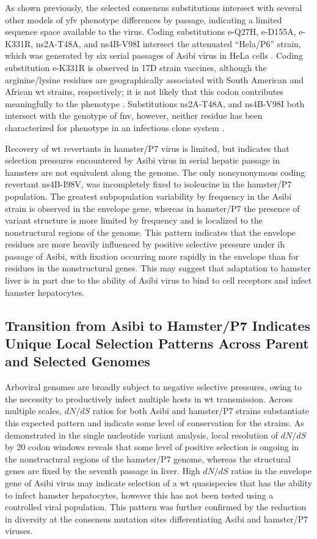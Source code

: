 As shown previously, the selected consensus substitutions intersect with several other models of \gls{yfv} phenotype differences by passage, indicating a limited sequence space available to the virus. Coding substitutions \gls{e}-Q27H, \gls{e}-D155A, \gls{e}-K331R, \gls{ns}2A-T48A, and \gls{ns}4B-V98I intersect the attenuated “Hela/P6” strain, which was generated by six serial passages of Asibi virus in HeLa cells \parencite{Dunster:1990jd}. Coding substitution \gls{e}-K331R is observed in 17D strain vaccines, although the arginine/lysine residues are geographically associated with South American and African \gls{wt} strains, respectively; it is not likely that this codon contributes meaningfully to the phenotype \parencite{Hahn:1987tw,dosSantos:1995wq}. Substitutions \gls{ns}2A-T48A, and \gls{ns}4B-V98I both intersect with the genotype of \gls{fnv}, however, neither residue has been characterized for phenotype in an infectious clone system \parencite{Wang:1995vu}.

Recovery of \gls{wt} revertants in hamster/P7 virus is limited, but indicates that selection pressures encountered by Asibi virus in serial hepatic passage in hamsters are not equivalent along the genome. The only nonsynonymous coding revertant \gls{ns}4B-I98V, was incompletely fixed to isoleucine in the hamster/P7 population. The greatest subpopulation variability by frequency in the Asibi strain is observed in the envelope gene, whereas in hamster/P7 the presence of variant structure is more limited by frequency and is localized to the nonstructural regions of the genome. This pattern indicates that the envelope residues are more heavily influenced by positive selective pressure under \gls{ih} passage of Asibi, with fixation occurring more rapidly in the envelope than for residues in the nonstructural genes. This may suggest that adaptation to hamster liver is in part due to the ability of Asibi virus to bind to cell receptors and infect hamster hepatocytes. 

\subsection{Transition from Asibi to Hamster/P7 Indicates Unique Local Selection Patterns Across Parent and Selected Genomes}
Arboviral genomes are broadly subject to negative selective pressures, owing to the necessity to productively infect multiple hosts in \gls{wt} transmission. Across multiple scales, $dN/dS$ ratios for both Asibi and hamster/P7 strains substantiate this expected pattern and indicate some level of conservation for the strains. As demonstrated in the single nucleotide variant analysis, local resolution of $dN/dS$ by 20 codon windows reveals that some level of positive selection is ongoing in the nonstructural regions of the hamster/P7 genome, whereas the structural genes are fixed by the seventh passage in liver. High $dN/dS$ ratios in the envelope gene of Asibi virus may indicate selection  of a \gls{wt} quasispecies that has the ability to infect hamster hepatocytes, however this has not been tested using a controlled viral population. This pattern was further confirmed by the reduction in diversity at the consensus mutation sites differentiating Asibi and hamster/P7 viruses.
